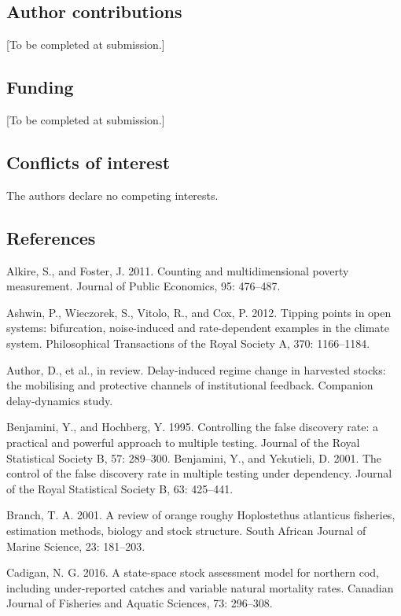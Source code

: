 \documentclass[11pt]{article}
\begin{document}
\subsection{Author contributions}\label{author-contributions}

{[}To be completed at submission.{]}

\subsection{Funding}\label{funding}

{[}To be completed at submission.{]}

\subsection{Conflicts of interest}\label{conflicts-of-interest}

The authors declare no competing interests.

\subsection{References}\label{references}

Alkire, S., and Foster, J. 2011. Counting and multidimensional poverty
measurement. Journal of Public Economics, 95: 476--487.

Ashwin, P., Wieczorek, S., Vitolo, R., and Cox, P. 2012. Tipping points
in open systems: bifurcation, noise-induced and rate-dependent examples
in the climate system. Philosophical Transactions of the Royal Society
A, 370: 1166--1184.

Author, D., et al., in review. Delay-induced regime change in harvested
stocks: the mobilising and protective channels of institutional
feedback. Companion delay-dynamics study.

Benjamini, Y., and Hochberg, Y. 1995. Controlling the false discovery
rate: a practical and powerful approach to multiple testing. Journal of
the Royal Statistical Society B, 57: 289--300. Benjamini, Y., and
Yekutieli, D. 2001. The control of the false discovery rate in multiple
testing under dependency. Journal of the Royal Statistical Society B,
63: 425--441.

Branch, T. A. 2001. A review of orange roughy Hoplostethus atlanticus
fisheries, estimation methods, biology and stock structure. South
African Journal of Marine Science, 23: 181--203.

Cadigan, N. G. 2016. A state-space stock assessment model for northern
cod, including under-reported catches and variable natural mortality
rates. Canadian Journal of Fisheries and Aquatic Sciences, 73: 296--308.
\end{document}

